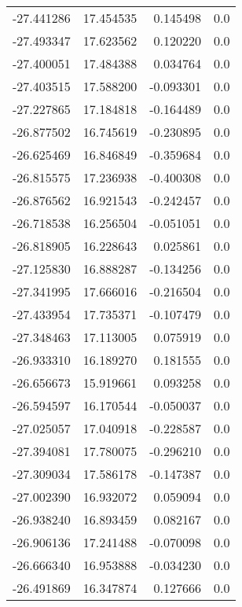 \begin{tabular}{rrrr}
      -27.441286 &        17.454535 &    0.145498 &   0.0 \\
      -27.493347 &        17.623562 &    0.120220 &   0.0 \\
      -27.400051 &        17.484388 &    0.034764 &   0.0 \\
      -27.403515 &        17.588200 &   -0.093301 &   0.0 \\
      -27.227865 &        17.184818 &   -0.164489 &   0.0 \\
      -26.877502 &        16.745619 &   -0.230895 &   0.0 \\
      -26.625469 &        16.846849 &   -0.359684 &   0.0 \\
      -26.815575 &        17.236938 &   -0.400308 &   0.0 \\
      -26.876562 &        16.921543 &   -0.242457 &   0.0 \\
      -26.718538 &        16.256504 &   -0.051051 &   0.0 \\
      -26.818905 &        16.228643 &    0.025861 &   0.0 \\
      -27.125830 &        16.888287 &   -0.134256 &   0.0 \\
      -27.341995 &        17.666016 &   -0.216504 &   0.0 \\
      -27.433954 &        17.735371 &   -0.107479 &   0.0 \\
      -27.348463 &        17.113005 &    0.075919 &   0.0 \\
      -26.933310 &        16.189270 &    0.181555 &   0.0 \\
      -26.656673 &        15.919661 &    0.093258 &   0.0 \\
      -26.594597 &        16.170544 &   -0.050037 &   0.0 \\
      -27.025057 &        17.040918 &   -0.228587 &   0.0 \\
      -27.394081 &        17.780075 &   -0.296210 &   0.0 \\
      -27.309034 &        17.586178 &   -0.147387 &   0.0 \\
      -27.002390 &        16.932072 &    0.059094 &   0.0 \\
      -26.938240 &        16.893459 &    0.082167 &   0.0 \\
      -26.906136 &        17.241488 &   -0.070098 &   0.0 \\
      -26.666340 &        16.953888 &   -0.034230 &   0.0 \\
      -26.491869 &        16.347874 &    0.127666 &   0.0 \\

\end{tabular}
